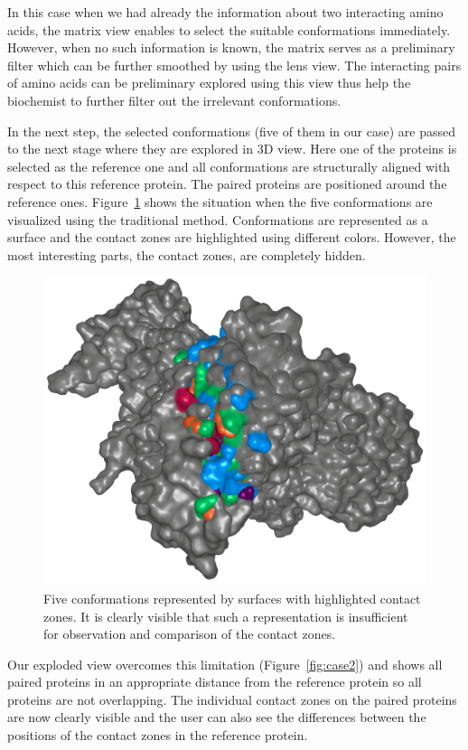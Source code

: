 \documentclass[journal]{vgtc}                %
\begin{document}
In this case when we had already the information about two interacting amino acids, the matrix view enables to select the suitable conformations immediately.
However, when no such information is known, the matrix serves as a preliminary filter which can be further smoothed by using the lens view.
The interacting pairs of amino acids can be preliminary explored using this view thus help the biochemist to further filter out the irrelevant conformations.

In the next step, the selected conformations (five of them in our case) are passed to the next stage where they are explored in 3D view.
Here one of the proteins is selected as the reference one and all conformations are structurally aligned with respect to this reference protein.
The paired proteins are positioned around the reference ones.
Figure~\ref{fig:case1} shows the situation when the five conformations are visualized using the traditional method.
Conformations are represented as a surface and the contact zones are highlighted using different colors.
However, the most interesting parts, the contact zones, are completely hidden.

\begin{figure}[bt]
  \centering
  \includegraphics[width=0.8\columnwidth]{case1.png}
  \caption{Five conformations represented by surfaces with highlighted contact zones. It is clearly visible that such a representation is insufficient for observation and comparison of the contact zones.}
  \label{fig:case1}
\end{figure}

Our exploded view overcomes this limitation (Figure~\ref{fig:case2}) and shows all paired proteins in an appropriate distance from the reference protein so all proteins are not overlapping.
The individual contact zones on the paired proteins are now clearly visible and the user can also see the differences between the positions of the contact zones in the reference protein.
\end{document}
